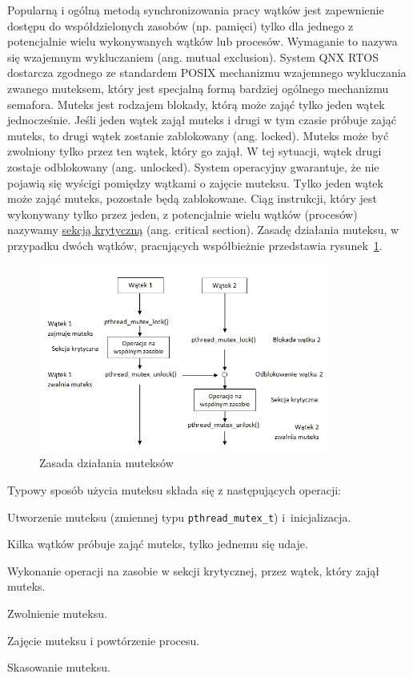Popularną i ogólną metodą synchronizowania pracy wątków jest zapewnienie dostępu do współdzielonych zasobów (np. pamięci) tylko dla jednego z potencjalnie wielu wykonywanych wątków lub procesów. Wymaganie to nazywa się wzajemnym wykluczaniem (ang. mutual exclusion). System QNX RTOS dostarcza zgodnego ze standardem POSIX mechanizmu wzajemnego wykluczania zwanego muteksem, który jest specjalną formą bardziej ogólnego mechanizmu semafora. Muteks jest rodzajem blokady, którą może zająć tylko jeden wątek jednocześnie. Jeśli jeden wątek zajął muteks i drugi w tym czasie próbuje zająć muteks, to drugi wątek zostanie zablokowany (ang. locked). Muteks może być zwolniony tylko przez ten wątek, który go zajął. W tej sytuacji, wątek drugi zostaje odblokowany (ang. unlocked). System operacyjny gwarantuje, że nie pojawią się wyścigi pomiędzy wątkami o zajęcie muteksu. Tylko jeden wątek może zająć muteks, pozostałe będą zablokowane. Ciąg instrukcji, który jest wykonywany tylko przez jeden, z potencjalnie wielu wątków (procesów) nazywamy \underline{sekcją krytyczną} (ang. critical section). Zasadę działania muteksu, w przypadku dwóch wątków, pracujących współbieżnie przedstawia rysunek~\ref{fig:mutex}.

\begin{figure}[!h]
\centering
\includegraphics[width=0.85\textwidth]{img/mutex}
\caption{Zasada działania muteksów}
\label{fig:mutex}
\end{figure}

Typowy sposób użycia muteksu składa się z następujących operacji:

\begin{myenumerate}
\item Utworzenie muteksu (zmiennej typu \lstinline[style=MyCStyle]{pthread_mutex_t}) i~inicjalizacja.
\item Kilka wątków próbuje zająć muteks, tylko jednemu się udaje.
\item Wykonanie operacji na zasobie w sekcji krytycznej, przez wątek, który zajął muteks.
\item Zwolnienie muteksu.
\item Zajęcie muteksu i powtórzenie procesu.
\item Skasowanie muteksu.
\end{myenumerate}

